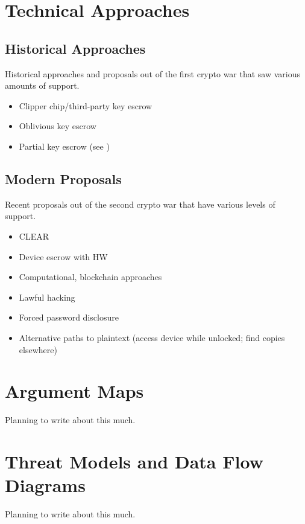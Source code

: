 \section{Technical Approaches}
\label{sec-tech-approaches}

\subsection{Historical Approaches}

Historical approaches and proposals out of the first crypto war that saw various amounts of support.

\begin{itemize}
    \item Clipper chip/third-party key escrow \cite{blaze_protocol_1994}
    \item Oblivious key escrow \cite{goos_oblivious_1996}
    \item Partial key escrow (see \cite{denning_taxonomy_1996})
\end{itemize}

\subsection{Modern Proposals}

Recent proposals out of the second crypto war that have various levels of support.

\begin{itemize}
    \item CLEAR \cite{ozzie_2018}
    \item Device escrow with HW \cite{savage_lawful_2018}
    \item Computational, blockchain approaches \cite{phan_key_2017}
    \item Lawful hacking \cite{nguyen_lawful_2017} \cite{soesanto_2018} \cite{kerr_encryption_2017}
    \item Forced password disclosure \cite{bittenbender_2019} \cite{kerr_encryption_2017}
    \item Alternative paths to plaintext (access device while unlocked; find copies elsewhere)
        \cite{kerr_encryption_2017}
\end{itemize}



\section{Argument Maps}
\label{sec-arg-maps-intro}

{\color{red} Planning to write about this much.} \lipsum[40]

\lipsum[40]



\section{Threat Models and Data Flow Diagrams}
\label{sec-threat-model-intro}

{\color{red} Planning to write about this much.} \lipsum[40]

\lipsum[40]

\lipsum[40]
